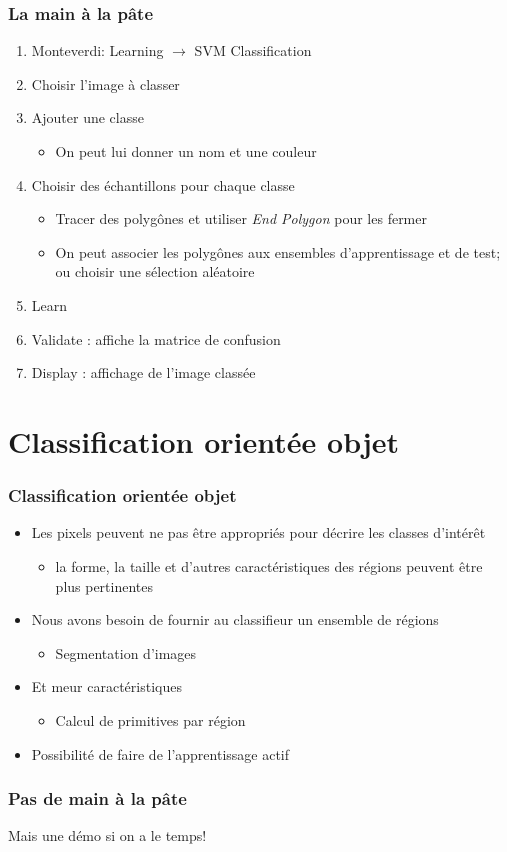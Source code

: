 \documentclass[compress]{beamer}
\begin{document}
\begin{frame}
  \frametitle{La main à la pâte}
  \begin{enumerate}
  \item Monteverdi: Learning $\rightarrow$ SVM Classification
  \item Choisir l'image à classer
  \item Ajouter une classe
    \begin{itemize}
    \item On peut lui donner un nom et une couleur
    \end{itemize}
  \item Choisir des échantillons pour chaque classe
    \begin{itemize}
    \item Tracer des polygônes et utiliser {\em End Polygon} pour les fermer
    \item On peut associer les polygônes aux ensembles d'apprentissage
      et de test; ou choisir une sélection aléatoire
    \end{itemize}
  \item Learn
  \item Validate : affiche la matrice de confusion
  \item Display : affichage de l'image classée
  \end{enumerate}    
\end{frame}

\section[Orienté objet]{Classification orientée objet}
\label{sec:objectoriented}
\begin{frame}
  \frametitle{Classification orientée objet}
  \begin{itemize}
  \item Les pixels peuvent ne pas être appropriés pour décrire les
    classes d'intérêt
    \begin{itemize}
    \item la forme, la taille et d'autres caractéristiques des régions
      peuvent être plus pertinentes
    \end{itemize}
  \item Nous avons besoin de fournir au classifieur un ensemble de régions
    \begin{itemize}
    \item Segmentation d'images
    \end{itemize}
  \item Et meur caractéristiques
    \begin{itemize}
    \item Calcul de primitives par région
    \end{itemize}
  \item Possibilité de faire de l'apprentissage actif
  \end{itemize}
\end{frame}

\begin{frame}
  \frametitle{Pas de main à la pâte}
Mais une démo si on a le temps!
\end{frame}
\end{document}
